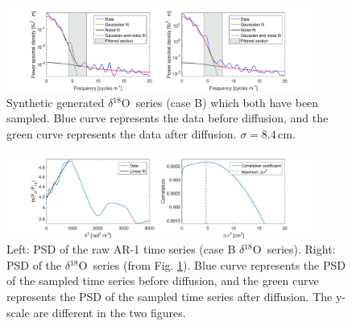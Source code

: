 \documentclass[11pt, draftcls, onecolumn]{IEEEtran} %
\numberwithin{equation}{section}
\numberwithin{table}{section}
\numberwithin{figure}{section}
\newcommand{\delOx}{$\delta{}^{18}\mathrm{O}$}
\begin{document}
\begin{appendices}
\begin{figure}[]
	\vspace*{2mm}
	\begin{center}
		\includegraphics[width=0.9\textwidth]{Figure_16}
		\caption{Synthetic generated \delOx~series (case B) which both have been sampled. Blue curve represents the data before
			diffusion, and the green curve represents the data after diffusion. $\sigma=8.4\,\mathrm{cm}$.}  \label{fig:appendix_synthetic_data}
	\end{center}
\end{figure}

\begin{figure}[]
	\vspace*{2mm}
	\begin{center}
		\includegraphics[width=0.9\textwidth]{Figure_17}
		\caption{Left: PSD of the raw AR-1 time series (case B \delOx~series). 
			Right: PSD of the \delOx~series (from Fig. \ref{fig:appendix_synthetic_data}). 
			Blue curve represents the PSD of the sampled time series before diffusion, 
			and the green curve represents the PSD of the sampled time series after diffusion. 
			The y-scale are different in the two figures.}  \label{fig:appendix_synthetic_PSD}
	\end{center}
\end{figure}



\end{appendices}
\end{document}
